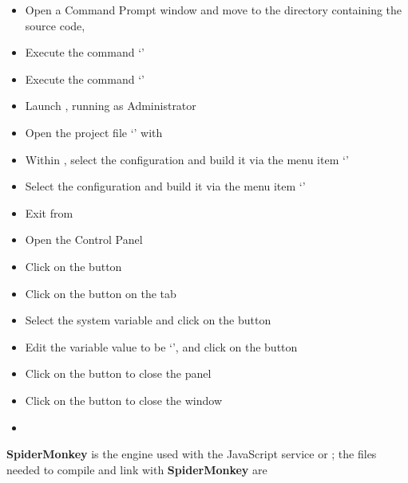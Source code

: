\tertiaryEnd{}
\begin{itemize}
\item Open a Command Prompt window and move to the directory containing the \mplusm{}
source code, 
\item\exSp{} Execute the command `'
\item\exSp{} Execute the command `'
\item\exSp{} Launch , running as Administrator
\item\exSp{} Open the project file
`' with
\item\exSp{} Within , select the  configuration and
build it via the menu item `'
\item\exSp{} Select the  configuration and build it via the menu item
`'
\item\exSp{} Exit from 
\item\exSp{} Open the  Control Panel
\item\exSp{} Click on the  button
\item\exSp{} Click on the  button on the 
tab
\item\exSp{} Select the  system variable and click on the 
button 
\item\exSp{} Edit the variable value to be `',
and click on the  button
\item\exSp{} Click on the  button to close the 
panel
\item\exSp{} Click on the  button to close the 
window
\end{itemize}
\tertiaryEnd{}
\begin{itemize}
\item\TBD{}
\end{itemize}
\tertiaryEnd{}
\secondaryEnd{}
\textbf{SpiderMonkey} is the  engine used with the JavaScript
service or \mplusm{}; the files needed to compile and link with \textbf{SpiderMonkey} are
